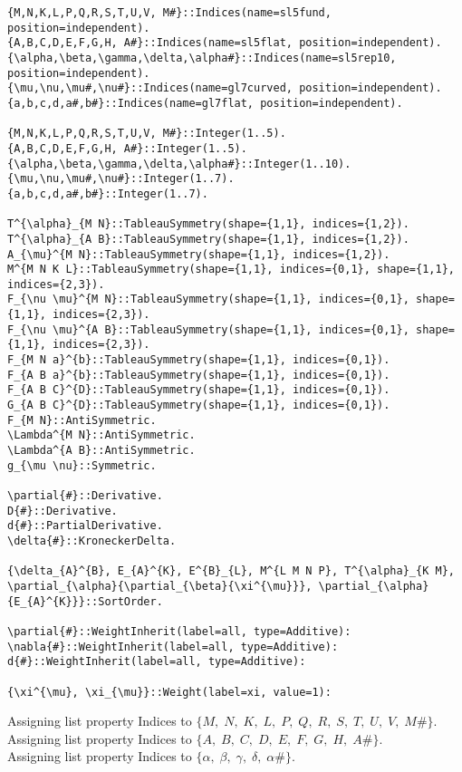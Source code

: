 \documentclass[11pt]{article}
\begin{document}
{\color[named]{Blue}\begin{verbatim}
{M,N,K,L,P,Q,R,S,T,U,V, M#}::Indices(name=sl5fund, position=independent).
{A,B,C,D,E,F,G,H, A#}::Indices(name=sl5flat, position=independent).
{\alpha,\beta,\gamma,\delta,\alpha#}::Indices(name=sl5rep10, position=independent).
{\mu,\nu,\mu#,\nu#}::Indices(name=gl7curved, position=independent).
{a,b,c,d,a#,b#}::Indices(name=gl7flat, position=independent).

{M,N,K,L,P,Q,R,S,T,U,V, M#}::Integer(1..5).
{A,B,C,D,E,F,G,H, A#}::Integer(1..5).
{\alpha,\beta,\gamma,\delta,\alpha#}::Integer(1..10).
{\mu,\nu,\mu#,\nu#}::Integer(1..7).
{a,b,c,d,a#,b#}::Integer(1..7).

T^{\alpha}_{M N}::TableauSymmetry(shape={1,1}, indices={1,2}).
T^{\alpha}_{A B}::TableauSymmetry(shape={1,1}, indices={1,2}).
A_{\mu}^{M N}::TableauSymmetry(shape={1,1}, indices={1,2}).
M^{M N K L}::TableauSymmetry(shape={1,1}, indices={0,1}, shape={1,1}, indices={2,3}).
F_{\nu \mu}^{M N}::TableauSymmetry(shape={1,1}, indices={0,1}, shape={1,1}, indices={2,3}).
F_{\nu \mu}^{A B}::TableauSymmetry(shape={1,1}, indices={0,1}, shape={1,1}, indices={2,3}).
F_{M N a}^{b}::TableauSymmetry(shape={1,1}, indices={0,1}).
F_{A B a}^{b}::TableauSymmetry(shape={1,1}, indices={0,1}).
F_{A B C}^{D}::TableauSymmetry(shape={1,1}, indices={0,1}).
G_{A B C}^{D}::TableauSymmetry(shape={1,1}, indices={0,1}).
F_{M N}::AntiSymmetric.
\Lambda^{M N}::AntiSymmetric.
\Lambda^{A B}::AntiSymmetric.
g_{\mu \nu}::Symmetric.

\partial{#}::Derivative.
D{#}::Derivative.
d{#}::PartialDerivative.
\delta{#}::KroneckerDelta.

{\delta_{A}^{B}, E_{A}^{K}, E^{B}_{L}, M^{L M N P}, T^{\alpha}_{K M},  \partial_{\alpha}{\partial_{\beta}{\xi^{\mu}}}, \partial_{\alpha}{E_{A}^{K}}}::SortOrder.

\partial{#}::WeightInherit(label=all, type=Additive):
\nabla{#}::WeightInherit(label=all, type=Additive):
d{#}::WeightInherit(label=all, type=Additive):

{\xi^{\mu}, \xi_{\mu}}::Weight(label=xi, value=1):
\end{verbatim}}
Assigning list property Indices to $\{M,\; N,\; K,\; L,\; P,\; Q,\; R,\; S,\; T,\; U,\; V,\; M\#\}$.
\\
Assigning list property Indices to $\{A,\; B,\; C,\; D,\; E,\; F,\; G,\; H,\; A\#\}$.
\\
Assigning list property Indices to $\{\alpha,\; \beta,\; \gamma,\; \delta,\; \alpha\#\}$.
\end{document}
